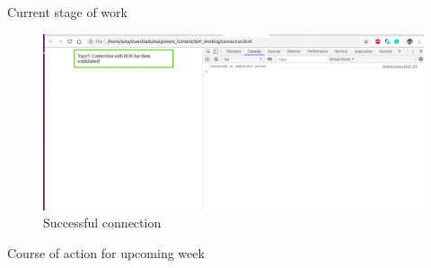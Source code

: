 \documentclass[aspectratio=169]{beamer}
\begin{document}
\begin{frame}{Current stage of work}
\begin{figure}
  \includegraphics[width=0.8\linewidth]{Connection.png}
  \caption{Successful connection}
  \label{fig:Connected}
\end{figure}
\end{frame}

\begin{frame}{Course of action for upcoming week}

\end{frame}
\end{document}
